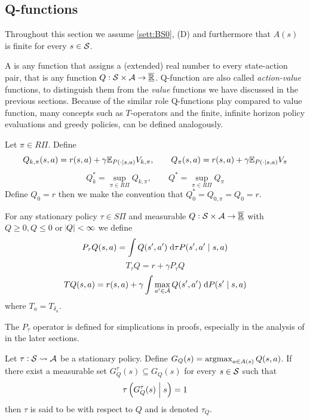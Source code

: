 \subsection{Q-functions}
Throughout this section we assume \cref{sett:BS0}, (D) and furthermore that
$A(s)$ is finite for every $s \in \mathcal{S}$.

A  is any function that assigns a (extended) real number
to every state-action pair, that is any function $Q : \mathcal{S} \times \mathcal{A}
\to \overline{\underline{\mathbb{R}}}$. Q-function are also called \emph{action-value} functions,
to distinguish them from the \emph{value} functions we have discussed in the
previous sections.
Because of the similar role Q-functions play compared to value function,
many concepts such as $T$-operators and the finite, infinite horizon
policy evaluations and greedy policies, can be defined analogously.

\begin{defn}
  Let $\pi \in R\Pi$.
  Define
  \[ Q_{k, \pi}(s, a) = r(s, a) + \gamma \mathbb{E}_{P(\cdot \mid s, a)} V_{k, \pi}
  ,\qquad Q_\pi(s, a) = r(s, a) + \gamma \mathbb{E}_{P(\cdot \mid s, a)} V_\pi \]
  \[ Q^*_k = \sup_{\pi \in R\Pi} Q_{k, \pi}
  , \qquad Q^* = \sup_{\pi \in R\Pi} Q_\pi \]
  Define $Q_0 = r$ then we make the convention that
  $Q^*_0 = Q_{0,\pi} = Q_0 = r$.
  \label{defn:polEvalQ}
\end{defn}
\begin{defn}
  For any stationary policy $\tau \in S\Pi$
  and measurable $Q:\mathcal{S} \times \mathcal{A} \to \overline{\underline{\mathbb{R}}}$ with
  $Q \geq 0, Q \leq 0$ or $\abs{Q} < \infty$ we define
  \[ P_\tau Q(s, a) = \int Q(s', a') \; \mathrm{d} \tau P(s', a' \mid s, a) \]
  \[ T_\tau Q = r + \gamma P_\tau Q \]
  \[ T Q(s, a) = r(s, a) + \gamma
  \int \max_{a' \in \mathcal{A}} Q(s', a') \; \mathrm{d} P(s' \mid s, a) \]
  where $T_a = T_{\delta_a}$.
  \label{defn:opQ}
\end{defn}
\begin{rem}
  The $P_\tau$ operator is defined for simplications in proofs, especially
  in the analysis of  in the later sections.
\end{rem}
\begin{defn}
  Let $\tau : \mathcal{S} \leadsto \mathcal{A}$ be a stationary policy. Define
  $G_Q(s) = \operatorname*{argmax}_{a \in A(s)} Q(s, a)$.
  If there exist a measurable set $G_Q^\tau(s) \subseteq G_Q(s)$
  for every $s \in \mathcal{S}$ such that
  \[ \tau \left( G_Q^\tau(s) \;\middle\vert\; s \right) = 1 \]
  then $\tau$ is said to be  with respect to $Q$ and is
  denoted $\tau_Q$.
  \label{defn:greedyQ}
\end{defn}

